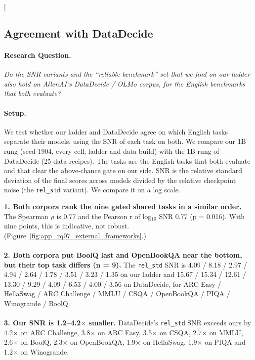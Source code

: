 \clearpage
\twocolumn[{%
\rqparent
\subsection{Agreement with DataDecide}
\label{app:rq07_external_frameworks}

\noindent\begin{minipage}[t]{0.485\textwidth}
\vspace{0pt}
\paragraph{Research Question.} \emph{Do the SNR variants and the ``reliable benchmark'' set that we find on our ladder also hold on AllenAI's DataDecide / OLMo corpus, for the English benchmarks that both evaluate?}

\paragraph{Setup.} We test whether our ladder and DataDecide agree on which English tasks separate their models, using the SNR of each task on both. We compare our 1B rung (seed 1904, every cell, ladder and data build) with the 1B rung of DataDecide (25 data recipes). The tasks are the English tasks that both evaluate and that clear the above-chance gate on our side. SNR is the relative standard deviation of the final scores across models divided by the relative checkpoint noise (the \texttt{rel\_std} variant). We compare it on a log scale.
\end{minipage}\hfill
\begin{minipage}[t]{0.485\textwidth}
\vspace{0pt}
\begin{rqfinding}
\textbf{1. Both corpora rank the nine gated shared tasks in a similar order.} The Spearman $\rho$ is 0.77 and the Pearson r of log$_{10}$ SNR 0.77 (p = 0.016). With nine points, this is indicative, not robust. (Figure~\ref{fig:app_rq07_external_frameworks}.)
\\
\\
\textbf{2. Both corpora put BoolQ last and OpenBookQA near the bottom, but their top task differs (n = 9).} The \texttt{rel\_std} SNR is 4.09 / 8.18 / 2.97 / 4.94 / 2.64 / 1.78 / 3.51 / 3.23 / 1.35 on our ladder and 15.67 / 15.34 / 12.61 / 13.30 / 9.29 / 4.09 / 6.53 / 4.00 / 3.56 on DataDecide, for ARC Easy / HellaSwag / ARC Challenge / MMLU / CSQA / OpenBookQA / PIQA / Winogrande / BoolQ.
\\
\\
\textbf{3. Our SNR is 1.2--4.2$\times$ smaller.} DataDecide's \texttt{rel\_std} SNR exceeds ours by 4.2$\times$ on ARC Challenge, 3.8$\times$ on ARC Easy, 3.5$\times$ on CSQA, 2.7$\times$ on MMLU, 2.6$\times$ on BoolQ, 2.3$\times$ on OpenBookQA, 1.9$\times$ on HellaSwag, 1.9$\times$ on PIQA and 1.2$\times$ on Winogrande.
\end{rqfinding}
\end{minipage}

}
